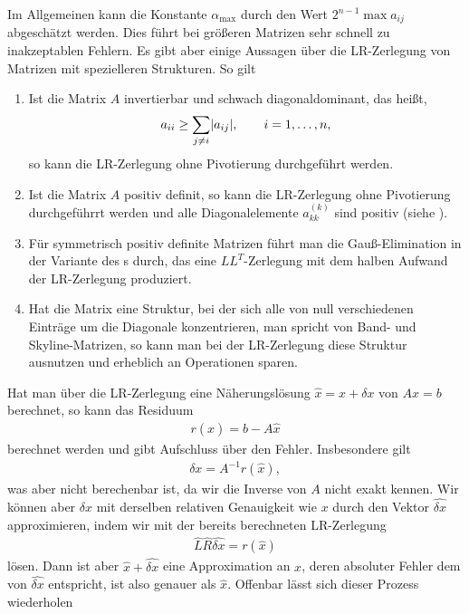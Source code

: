 \begin{remark}
  Im Allgemeinen kann die Konstante $\alpha_{\max}$ durch den Wert
  $2^{n-1} \max a_{ij}$ abgeschätzt werden. Dies führt bei
  größeren Matrizen sehr schnell zu inakzeptablen Fehlern.
  Es gibt aber einige Aussagen über die LR-Zerlegung von Matrizen mit
  spezielleren Strukturen. So gilt
  \begin{enumerate}
  \item Ist die Matrix $A$ invertierbar und schwach diagonaldominant,
    das heißt,
    \begin{gather}
      a_{ii} \ge \sum_{j\neq i} \lvert a_{ij}\rvert,
      \qquad i=1,\dots,n,
    \end{gather}
    so kann die LR-Zerlegung ohne Pivotierung durchgeführt werden.
  \item Ist die Matrix $A$ positiv definit, so kann die LR-Zerlegung
    ohne Pivotierung durchgeführrt werden und alle Diagonalelemente
    $a_{kk}^{(k)}$ sind positiv (siehe \cite[Satz 4.7]{Rannacher17}).
  \item Für symmetrisch positiv definite Matrizen führt man die
    Gauß-Elimination in der Variante des
    s durch, das eine $LL^T$-Zerlegung
    mit dem halben Aufwand der LR-Zerlegung produziert.
  \item Hat die Matrix eine Struktur, bei der sich alle von null
    verschiedenen Einträge um die Diagonale konzentrieren, man spricht
    von Band- und Skyline-Matrizen, so kann man bei der LR-Zerlegung
    diese Struktur ausnutzen und erheblich an Operationen sparen.
  \end{enumerate}
\end{remark}

\begin{remark}
  Hat man über die LR-Zerlegung eine Näherungslösung
  $\widehat x = x+\delta x$ von $Ax=b$ berechnet, so kann das Residuum
  \begin{gather}
    r(\widehat x) = b-A \widehat x
  \end{gather}
  berechnet werden und gibt Aufschluss über den Fehler. Insbesondere gilt
  \begin{gather}
    \delta x = A^{-1} r(\widehat x),
  \end{gather}
  was aber nicht berechenbar ist, da wir die Inverse von $A$ nicht
  exakt kennen. Wir können aber $\delta x$ mit derselben relativen
  Genauigkeit wie $x$ durch den Vektor $\widehat{\delta x}$ approximieren, indem
  wir mit der bereits berechneten LR-Zerlegung
  \begin{gather}
    \widehat L \widehat R \widehat{\delta x} = r(\widehat x)
  \end{gather}
  lösen. Dann ist aber $\widehat x + \widehat{\delta x}$ eine
  Approximation an $x$, deren absoluter Fehler dem von
  $\widehat{\delta x}$ entspricht, ist also genauer als $\widehat x$.
  Offenbar lässt sich dieser Prozess wiederholen
\end{remark}

